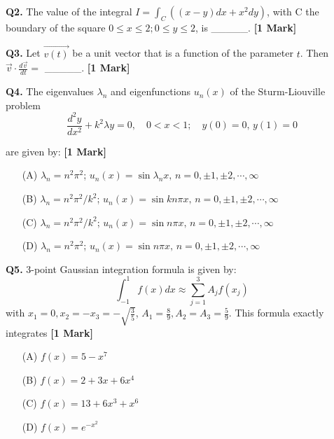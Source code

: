 \documentclass[11pt]{article}
\newcommand{\questiona}[2]{
    \noindent\textbf{Q#2.} #1 \hfill \textbf{[1 Mark]}
}
\begin{document}
\vspace{0.5cm}

\questiona{The value of the integral \(I = \int_C ((x - y)dx + x^2dy)\), with C the boundary of the square \(0 \leq x \leq 2; 0 \leq y \leq 2\), is \_\_\_\_\_.}{2}

\vspace{0.5cm}

\questiona{Let \(\overrightarrow{v(t)}\) be a unit vector that is a function of the parameter \(t\). Then \(\overrightarrow{v} \cdot \frac{d\vec{v}}{dt} =\) \_\_\_\_\_.}{3}

\vspace{0.5cm}

\questiona{The eigenvalues \(\lambda_n\) and eigenfunctions \(u_n(x)\) of the Sturm-Liouville problem
\[
\frac{d^2 y}{dx^2} + k^2 \lambda y = 0, \quad 0 < x < 1;\quad y(0) = 0, \, y(1) = 0
\]

are given by:}{4}
\begin{enumerate}
    \item[(A)] \(\lambda_n = n^2\pi^2\); \(u_n(x) = \sin \lambda_n x, \, n = 0, \pm 1, \pm 2, \cdots, \infty\)
    \item[(B)] \(\lambda_n = n^2\pi^2/k^2\); \(u_n(x) = \sin kn\pi x, \, n = 0, \pm 1, \pm 2, \cdots, \infty\)
    \item[(C)] \(\lambda_n = n^2\pi^2/k^2\); \(u_n(x) = \sin n\pi x, \, n = 0, \pm 1, \pm 2, \cdots, \infty\)
    \item[(D)] \(\lambda_n = n^2\pi^2\); \(u_n(x) = \sin n\pi x, \, n = 0, \pm 1, \pm 2, \cdots, \infty\)
\end{enumerate}

\vspace{0.5cm}

\questiona{3-point Gaussian integration formula is given by:
\[\int_{-1}^{1} f(x) dx \approx \sum_{j=1}^{3} A_j f(x_j)\]
with \( x_1 = 0, x_2 = -x_3 = -\sqrt{\frac{3}{5}} \), \( A_1 = \frac{8}{9}, A_2 = A_3 = \frac{5}{9} \). This formula exactly integrates}{5}
\begin{enumerate}
    \item[(A)] \( f(x) = 5 - x^7 \)
    \item[(B)] \( f(x) = 2 + 3x + 6x^4 \)
    \item[(C)] \( f(x) = 13 + 6x^3 + x^6 \)
    \item[(D)] \( f(x) = e^{-x^2} \)
\end{enumerate}

\vspace{0.5cm}
\end{document}
